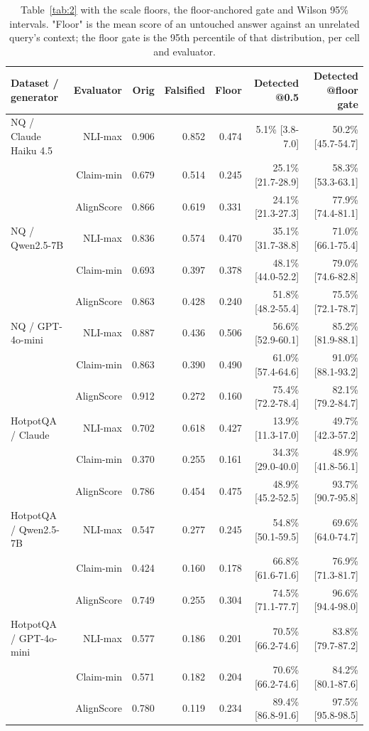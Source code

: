 \documentclass[11pt]{article}
\begin{document}
\begin{table}[t]
\centering
\small
\begin{tabular}{lrrrrrr}
\toprule
\textbf{Dataset / generator} & \textbf{Evaluator} & \textbf{Orig} & \textbf{Falsified} & \textbf{Floor} & \textbf{Detected @0.5} & \textbf{Detected @floor gate} \\
\midrule
NQ / Claude Haiku 4.5 & NLI-max & 0.906 & 0.852 & 0.474 & 5.1\% [3.8-7.0] & 50.2\% [45.7-54.7] \\
 & Claim-min & 0.679 & 0.514 & 0.245 & 25.1\% [21.7-28.9] & 58.3\% [53.3-63.1] \\
 & AlignScore & 0.866 & 0.619 & 0.331 & 24.1\% [21.3-27.3] & 77.9\% [74.4-81.1] \\
NQ / Qwen2.5-7B & NLI-max & 0.836 & 0.574 & 0.470 & 35.1\% [31.7-38.8] & 71.0\% [66.1-75.4] \\
 & Claim-min & 0.693 & 0.397 & 0.378 & 48.1\% [44.0-52.2] & 79.0\% [74.6-82.8] \\
 & AlignScore & 0.863 & 0.428 & 0.240 & 51.8\% [48.2-55.4] & 75.5\% [72.1-78.7] \\
NQ / GPT-4o-mini & NLI-max & 0.887 & 0.436 & 0.506 & 56.6\% [52.9-60.1] & 85.2\% [81.9-88.1] \\
 & Claim-min & 0.863 & 0.390 & 0.490 & 61.0\% [57.4-64.6] & 91.0\% [88.1-93.2] \\
 & AlignScore & 0.912 & 0.272 & 0.160 & 75.4\% [72.2-78.4] & 82.1\% [79.2-84.7] \\
\midrule
HotpotQA / Claude & NLI-max & 0.702 & 0.618 & 0.427 & 13.9\% [11.3-17.0] & 49.7\% [42.3-57.2] \\
 & Claim-min & 0.370 & 0.255 & 0.161 & 34.3\% [29.0-40.0] & 48.9\% [41.8-56.1] \\
 & AlignScore & 0.786 & 0.454 & 0.475 & 48.9\% [45.2-52.5] & 93.7\% [90.7-95.8] \\
HotpotQA / Qwen2.5-7B & NLI-max & 0.547 & 0.277 & 0.245 & 54.8\% [50.1-59.5] & 69.6\% [64.0-74.7] \\
 & Claim-min & 0.424 & 0.160 & 0.178 & 66.8\% [61.6-71.6] & 76.9\% [71.3-81.7] \\
 & AlignScore & 0.749 & 0.255 & 0.304 & 74.5\% [71.1-77.7] & 96.6\% [94.4-98.0] \\
HotpotQA / GPT-4o-mini & NLI-max & 0.577 & 0.186 & 0.201 & 70.5\% [66.2-74.6] & 83.8\% [79.7-87.2] \\
 & Claim-min & 0.571 & 0.182 & 0.204 & 70.6\% [66.2-74.6] & 84.2\% [80.1-87.6] \\
 & AlignScore & 0.780 & 0.119 & 0.234 & 89.4\% [86.8-91.6] & 97.5\% [95.8-98.5] \\
\bottomrule
\end{tabular}
\caption{Table~\ref{tab:2} with the scale floors, the floor-anchored gate and Wilson 95\% intervals. "Floor" is the mean score of an untouched answer against an unrelated query's context; the floor gate is the 95th percentile of that distribution, per cell and evaluator.}
\label{tab:2full}
\end{table}
\end{document}
